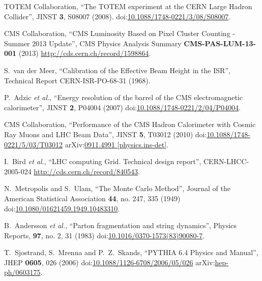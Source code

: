 \begin{thebibliography}{99}
TOTEM Collaboration, ``The TOTEM experiment at the CERN Large Hadron Collider'', JINST {\bf 3}, S08007 (2008). doi:\href{http://dx.doi.org/10.1088/1748-0221/3/08/S08007}{10.1088/1748-0221/3/08/S08007}.

CMS Collaboration, ``CMS Luminosity Based on Pixel Cluster Counting - Summer 2013 Update'', CMS Physics Analysis Summary {\bf CMS-PAS-LUM-13-001} (2013) \url{http://cds.cern.ch/record/1598864}.

S.~van der Meer, ``Calibration of the Effective Beam Height in the ISR'', Technical Report CERN-ISR-PO-68-31 (1968).



P.~Adzic {\it et al.}, ``Energy resolution of the barrel of the CMS electromagnetic calorimeter'', JINST {\bf 2}, P04004 (2007) doi:\href{http://dx.doi.org/10.1088/1748-0221/2/04/P04004}{10.1088/1748-0221/2/04/P04004}. 

CMS Collaboration, ``Performance of the CMS Hadron Calorimeter with Cosmic Ray Muons and LHC Beam Data'', JINST {\bf 5}, T03012 (2010) doi:\href{http://dx.doi.org/10.1088/1748-0221/5/03/T03012}{10.1088/1748-0221/5/03/T03012} arXiv:\href{https://arxiv.org/abs/0911.4991}{0911.4991 [physics.ins-det]}.

I.~Bird {\it et al.}, ``LHC computing Grid. Technical design report'', CERN-LHCC-2005-024 \url{http://cds.cern.ch/record/840543}.


N.~Metropolis and S.~Ulam, ``The Monte Carlo Method'', Journal of the American Statistical Association {\bf 44}, no. 247, 335 (1949) doi:\href{http://dx.doi.org/10.2307/2280232}{10.1080/01621459.1949.10483310}.

B.~Andersson {\it et al.}, ``Parton fragmentation and string dynamics'', Physics Reports, {\bf 97}, no. 2, 31 (1983) doi:\href{http://www.sciencedirect.com/science/article/pii/0370157383900807}{10.1016/0370-1573(83)90080-7}.

T.~Sjostrand, S.~Mrenna and P.~Z.~Skands, ``PYTHIA 6.4 Physics and Manual'', JHEP {\bf 0605}, 026 (2006) doi:\href{http://dx.doi.org/10.1088/1126-6708/2006/05/026}{10.1088/1126-6708/2006/05/026} arXiv:\href{https://arxiv.org/abs/hep-ph/0603175}{hep-ph/0603175}.


\end{thebibliography}
